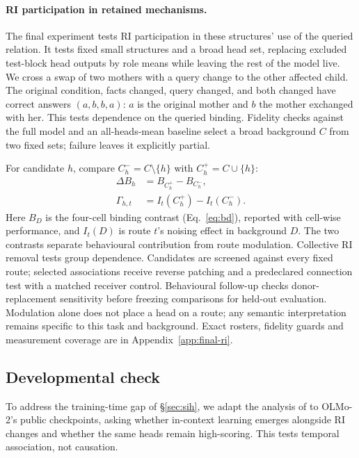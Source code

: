 \paragraph{RI participation in retained mechanisms.}
The final experiment tests RI participation in these structures' use of
the queried relation. It tests fixed small structures and a
broad head set, replacing excluded test-block head outputs by role means while
leaving the rest of the model live. We cross a swap of two mothers with a query
change to the other affected child. The original condition, facts changed, query changed, and
both changed have correct answers $(a,b,b,a)$: $a$ is the original mother and $b$
the mother exchanged with her. This tests dependence on the queried binding.
Fidelity checks against the
full model and an all-heads-mean baseline select a broad background $C$ from two
fixed sets; failure leaves it explicitly partial.

For candidate $h$, compare $C_h^-=C\setminus\{h\}$ with $C_h^+=C\cup\{h\}$:
\begin{align}
\Delta B_h &= B_{C_h^+}-B_{C_h^-}, \label{eq:ri-functional}\\
\Gamma_{h,t} &= I_t(C_h^+)-I_t(C_h^-). \label{eq:ri-route}
\end{align}
Here $B_D$ is the four-cell binding contrast (Eq.~\ref{eq:bd}), reported with
cell-wise performance, and $I_t(D)$ is route $t$'s noising effect in background
$D$. The two contrasts separate behavioural contribution from route modulation.
Collective RI removal tests group dependence. Candidates are screened
against every fixed route; selected associations receive reverse patching and a
predeclared connection test with a matched receiver control. Behavioural
follow-up checks donor-replacement sensitivity before freezing comparisons for
held-out evaluation. Modulation alone does not place a head on a route; any
semantic interpretation remains specific to this task and background. Exact
rosters, fidelity guards and measurement coverage are in
Appendix~\ref{app:final-ri}.

\subsection{Developmental check}
\label{sec:method-dev}

To address the training-time gap of \S\ref{sec:sih}, we adapt the analysis of
\citet{ren2024semantic} to OLMo-2's public checkpoints, asking whether in-context
learning emerges alongside RI changes and whether the same heads remain
high-scoring. This tests temporal association, not causation.

